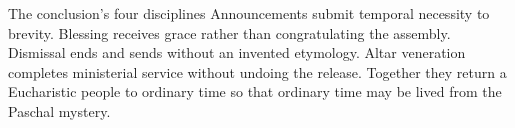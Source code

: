 \begin{studybox}{The conclusion's four disciplines}
Announcements submit temporal necessity to brevity. Blessing receives grace rather than congratulating the assembly. Dismissal ends and sends without an invented etymology. Altar veneration completes ministerial service without undoing the release. Together they return a Eucharistic people to ordinary time so that ordinary time may be lived from the Paschal mystery.
\end{studybox}

